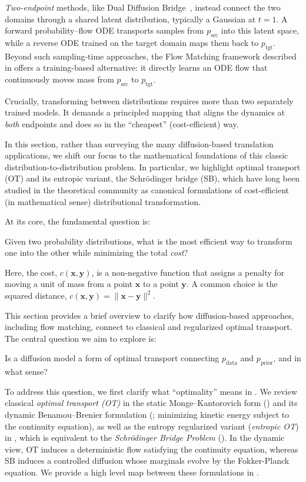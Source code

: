 \emph{Two-endpoint} methods, like Dual Diffusion Bridge~\citep{su2022dual}, instead connect the two domains through a shared latent distribution, typically a Gaussian at $t=1$.  
A forward probability–flow ODE transports samples from $p_{\mathrm{src}}$ into this latent space, while a reverse ODE trained on the target domain maps them back to $p_{\mathrm{tgt}}$.  
Beyond such sampling-time approaches, the Flow Matching framework described in  offers a training-based alternative: it directly learns an ODE flow that continuously moves mass from $p_{\mathrm{src}}$ to $p_{\mathrm{tgt}}$.  

Crucially, transforming between distributions requires more than two separately trained models. 
It demands a principled mapping that aligns the dynamics at \emph{both} endpoints and does so in the ``cheapest'' (cost-efficient) way. 

In this section, rather than surveying the many diffusion-based translation applications, we shift our focus to the mathematical foundations of this classic distribution-to-distribution problem.  
In particular, we highlight optimal transport (OT) and its entropic variant, the Schrödinger bridge (SB), which have long been studied in the theoretical community as canonical formulations of cost-efficient (in mathematical sense) distributional transformation.



At its core,  the fundamental question is: 
\begin{question}
    Given two probability distributions, what is the most efficient way to transform one into the other while minimizing the total \emph{cost}?
\end{question}
Here, the cost, $ c(\mathbf{x}, \mathbf{y}) $, is a non-negative function that assigns a penalty for moving a unit of mass from a point $ \mathbf{x}  $ to a point $ \mathbf{y}$. A common choice is the squared distance, $c(\mathbf{x}, \mathbf{y}) = \|\mathbf{x} - \mathbf{y}\|^2$.

This section provides a brief overview to clarify how diffusion-based approaches, including flow matching, connect to classical and regularized optimal transport. The central question we aim to explore is:
\begin{question}
    Is a diffusion model a form of optimal transport connecting $p_{\text{data}}$ and $p_{\text{prior}}$, and in what sense?
\end{question}


To address this question, we first clarify what ``optimality'' means in
. We review classical \emph{optimal transport (OT)} in the static
Monge--Kantorovich form () and its dynamic Benamou--Brenier formulation (; minimizing
kinetic energy subject to the continuity equation), as well as the entropy
regularized variant (\emph{entropic OT}) in , which is equivalent to the \emph{Schr\"odinger
Bridge Problem} (). In the dynamic view, OT induces a deterministic flow
satisfying the continuity equation, whereas SB induces a controlled diffusion
whose marginals evolve by the Fokker-Planck equation. We provide a high level
map between these formulations in .

